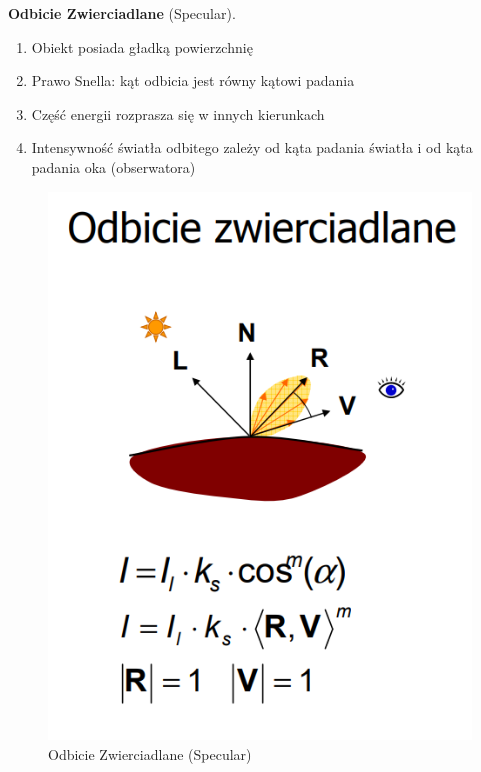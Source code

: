 \documentclass[12pt]{article}
\begin{document}
\textbf{Odbicie Zwierciadlane} (Specular).
\begin{enumerate}
\item Obiekt posiada gładką powierzchnię
\item Prawo Snella: kąt odbicia jest równy kątowi padania
\item Część energii rozprasza się w innych kierunkach
\item Intensywność światła odbitego zależy od kąta padania światła i od kąta padania oka (obserwatora)
\end{enumerate}
\begin{figure}[H]
	\centering
	\includegraphics[scale=0.5]{Pictures/specular.png}
	\caption{Odbicie Zwierciadlane (Specular)}
\end{figure}
\end{document}
